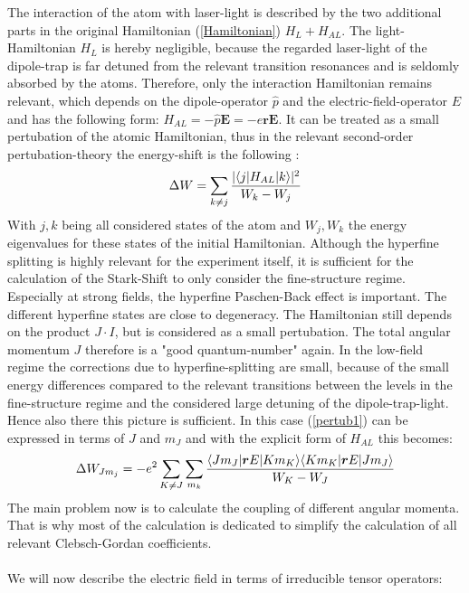 The interaction of the atom with laser-light is described by the two additional parts in the original Hamiltonian (\ref{Hamiltonian}) $H_L+H_{AL}$. The light-Hamiltonian $H_L$ is hereby negligible, because the regarded laser-light of the dipole-trap is far detuned from the relevant transition resonances and is seldomly absorbed by the atoms. Therefore, only the interaction Hamiltonian remains relevant, which depends on the dipole-operator $\hat{p}$ and the electric-field-operator $E$ and has the following form: $H_{AL}=-\hat{p} \boldsymbol{E}=-e\boldsymbol{r} \boldsymbol{E}$. It can be treated as a small pertubation of the atomic Hamiltonian, thus in the relevant second-order pertubation-theory the energy-shift is the following \cite{dipole}:
\begin{equation}
\Delta W=\sum_{k\neq j}\frac{|\langle j| H_{AL} | k\rangle|^2}{W_k-W_j}
\label{pertub1}
\end{equation}
With $j,k$ being all considered states of the atom and $W_j,W_k$ the energy eigenvalues for these states of the initial Hamiltonian.
Although the hyperfine splitting is highly relevant for the experiment itself, it is sufficient for the calculation of the Stark-Shift to only consider the fine-structure regime. Especially at strong fields, the hyperfine Paschen-Back effect is important. The different hyperfine states are close to degeneracy. The Hamiltonian still depends on the product $J\cdot I$, but is considered as a small pertubation. The total angular momentum $J$ therefore is a "good quantum-number" again. In the low-field regime the corrections due to hyperfine-splitting are small, because of the small energy differences compared to the relevant transitions between the levels in the fine-structure regime and the considered large detuning of the dipole-trap-light. Hence also there this picture is sufficient. In this case (\ref{pertub1}) can be expressed in terms of $J$ and $m_J$ and with the explicit form of $H_{AL}$ this becomes\cite{alpha}:
\begin{equation}
\Delta W_{Jm_j}=-e^2\sum_{K\neq J}\sum_{m_k}\frac{\langle Jm_J| \boldsymbol{r}E | Km_K\rangle\langle Km_K| \boldsymbol{r}E | Jm_J\rangle}{W_K-W_J}\label{pertub2}
\end{equation}
The main problem now is to calculate the coupling of different angular momenta. That is why most of the calculation is dedicated to simplify the calculation of all relevant Clebsch-Gordan coefficients.\\\\
We will now describe the electric field in terms of irreducible tensor operators:
